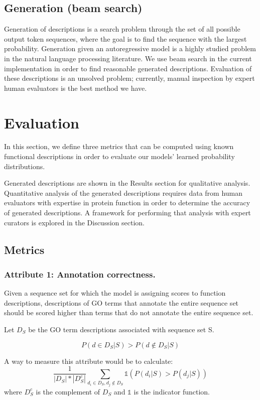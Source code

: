 \documentclass{specification}
\begin{document}
    \subsection{Generation (beam search)}
    Generation of descriptions is a search problem through the set of all possible output token sequences, where the goal is to find the sequence with the largest probability. Generation given an autoregressive model is a highly studied problem in the natural language processing literature. We use beam search in the current implementation in order to find reasonable generated descriptions. Evaluation of these descriptions is an unsolved problem; currently, manual inspection by expert human evaluators is the best method we have.
\section{Evaluation}
In this section, we define three metrics that can be computed using known functional descriptions in order to evaluate our models' learned probability distributions.

Generated descriptions are shown in the Results section for qualitative analysis.
Quantitative analysis of the generated descriptions requires data from human evaluators with expertise in protein function in order to determine the accuracy of generated descriptions.
A framework for performing that analysis with expert curators is explored in the Discussion section.
    \subsection{Metrics}
        \subsubsection{Attribute 1: Annotation correctness.}

        Given a sequence set for which the model is assigning scores to function descriptions, descriptions of GO terms that annotate the entire sequence set should be scored higher than terms that do not annotate the entire sequence set.

        Let $D_{S}$ be the GO term descriptions associated with sequence set S.

        \[P(d \in D_{S} | S) > P(d \notin D_{S} | S)\]

        A way to measure this attribute would be to calculate:
        \[\frac{1}{|D_{S}|*|D_{S}^{c}|}\sum_{d_i \in D_{S}, d_j \notin D_{S}} \mathds{1}(P(d_i | S) > P(d_j | S))\]
        where $D_{S}^{c}$ is the complement of $D_{S}$ and $\mathds{1}$ is the indicator function.
\end{document}
